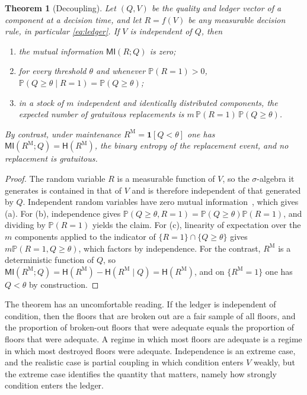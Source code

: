\documentclass[11pt]{article}
\newtheorem{theorem}{Theorem}[section]
\theoremstyle{definition}
\theoremstyle{remark}
\newcommand{\Prob}{\mathbb{P}}
\newcommand{\ind}{\mathbf{1}}
\newcommand{\MI}{\mathsf{MI}}
\newcommand{\Ent}{\mathsf{H}}
\begin{document}
\begin{theorem}[Decoupling]\label{thm:decoupling}
Let $(Q, V)$ be the quality and ledger vector of a component at a decision time, and let $R = f(V)$ be any measurable decision rule, in particular \eqref{eq:ledger}. If $V$ is independent of $Q$, then
\begin{enumerate}
\item[(a)] the mutual information $\MI(R;Q)$ is zero;
\item[(b)] for every threshold $\theta$ and whenever $\Prob(R=1)>0$, $\Prob(Q\ge\theta \mid R=1) = \Prob(Q\ge\theta)$;
\item[(c)] in a stock of $m$ independent and identically distributed components, the expected number of gratuitous replacements is $m\,\Prob(R=1)\,\Prob(Q\ge\theta)$.
\end{enumerate}
By contrast, under maintenance $R^{\mathrm{M}} = \ind[Q<\theta]$ one has $\MI(R^{\mathrm{M}};Q) = \Ent(R^{\mathrm{M}})$, the binary entropy of the replacement event, and no replacement is gratuitous.
\end{theorem}

\begin{proof}
The random variable $R$ is a measurable function of $V$, so the $\sigma$-algebra it generates is contained in that of $V$ and is therefore independent of that generated by $Q$. Independent random variables have zero mutual information~\cite{cover}, which gives (a). For (b), independence gives $\Prob(Q\ge\theta, R=1) = \Prob(Q\ge\theta)\Prob(R=1)$, and dividing by $\Prob(R=1)$ yields the claim. For (c), linearity of expectation over the $m$ components applied to the indicator of $\{R=1\}\cap\{Q\ge\theta\}$ gives $m\Prob(R=1,Q\ge\theta)$, which factors by independence. For the contrast, $R^{\mathrm{M}}$ is a deterministic function of $Q$, so $\MI(R^{\mathrm{M}};Q) = \Ent(R^{\mathrm{M}}) - \Ent(R^{\mathrm{M}}\mid Q) = \Ent(R^{\mathrm{M}})$, and on $\{R^{\mathrm{M}}=1\}$ one has $Q<\theta$ by construction.
\end{proof}

The theorem has an uncomfortable reading. If the ledger is independent of condition, then the floors that are broken out are a fair sample of all floors, and the proportion of broken-out floors that were adequate equals the proportion of floors that were adequate. A regime in which most floors are adequate is a regime in which most destroyed floors were adequate. Independence is an extreme case, and the realistic case is partial coupling in which condition enters $V$ weakly, but the extreme case identifies the quantity that matters, namely how strongly condition enters the ledger.
\end{document}

